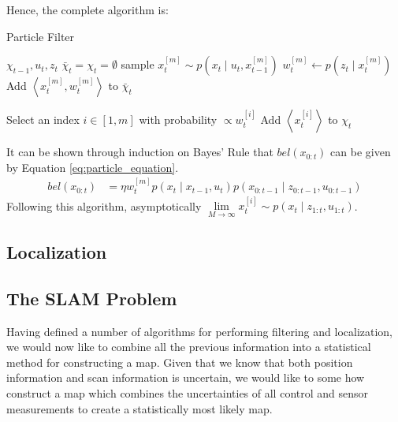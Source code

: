 \documentclass[english]{article}
\begin{document}
Hence, the complete algorithm is:
\begin{algorithm}
\caption{Particle Filter}
\label{alg:particle}
\begin{algorithmic}
	\REQUIRE $\chi_{t-1}, u_t, z_t$
        \STATE $\bar{\chi}_t = \chi_t = \emptyset$
        \STATE sample $x^{[m]}_t \sim p(x_t \mid u_t,x^{[m]}_{t-1})$
        \STATE $w^{[m]}_t \leftarrow p(z_t \mid x^{[m]}_t)$
        \STATE Add $\left\langle x^{[m]}_t, w^{[m]}_t \right\rangle$ to $\bar{\chi}_t$
        \ENDFOR

        \STATE Select an index $i \in [1,m]$ with probability $\propto w^{[i]}_t$
        \STATE Add $\left\langle x^{[i]}_t \right\rangle$ to $\chi_t$
        \ENDFOR

\end{algorithmic}
\end{algorithm}

It can be shown through induction on Bayes' Rule that $bel(x_{0:t})$ can be given by Equation \ref{eq:particle_equation}.
\begin{align}
  bel(x_{0:t}) & = \eta w^{[m]}_tp(x_t \mid x_{t-1}, u_t)p(x_{0:t-1} \mid z_{0:t-1},u_{0:t-1}) \label{eq:particle_equation}
\end{align}
Following this algorithm, asymptotically $\underset{M \to \infty}{\lim} x^{[i]}_t \sim p(x_t \mid z_{1:t}, u_{1:t})$.

\subsection{Localization}

\subsection{The SLAM Problem}
Having defined a number of algorithms for performing filtering and localization, we would now like to combine all the previous information into a statistical method for constructing a map. Given that we know that both position information and scan information is uncertain, we would like to some how construct a map which combines the uncertainties of all control and sensor measurements to create a statistically most likely map.
\end{document}
